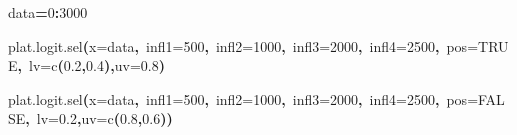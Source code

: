 \documentclass[letterpaper, 12pt]{article}
\newenvironment{Hinput}%
{}%
{}%
\newenvironment{Hchunk}%
{\vspace{0.5em}\par\begin{flushleft}}%
{\end{flushleft}}%
\newcommand{\hlnumber}[1]{\textcolor[rgb]{0.0823529411764706,0.0784313725490196,0.709803921568627}{#1}}%
\newcommand{\hlfunctioncall}[1]{\textcolor[rgb]{1,0,0}{#1}}%
\newcommand{\hlkeyword}[1]{\textcolor[rgb]{0,0,0}{\textbf{#1}}}%
\newcommand{\hlargument}[1]{\textcolor[rgb]{0.694117647058824,0.247058823529412,0.0196078431372549}{#1}}%
\newcommand{\hlassignement}[1]{\textcolor[rgb]{0.215686274509804,0.215686274509804,0.384313725490196}{\textbf{#1}}}%
\newcommand{\hlsymbol}[1]{\textcolor[rgb]{0,0,0}{#1}}%
\newcommand{\hlprompt}[1]{\textcolor[rgb]{0,0,0}{#1}}%
\begin{document}
\begin{Hchunk}
\begin{normalsize}
\begin{Hinput}
\ttfamily\noindent
\hlprompt{\usebox{\hlnormalsizeboxgreaterthan}{\ }}\hlsymbol{data}\hlassignement{=}\hlnumber{0}\hlkeyword{:}\hlnumber{3000}\mbox{}
\normalfont
\end{Hinput}


\begin{Hinput}
\ttfamily\noindent
\hlprompt{\usebox{\hlnormalsizeboxgreaterthan}{\ }}\hlfunctioncall{plat.logit.sel}\hlkeyword{(}\hlargument{x}\hlargument{=}\hlsymbol{data}\hlkeyword{,}{\ }\hlargument{infl1}\hlargument{=}\hlnumber{500}\hlkeyword{,}{\ }\hlargument{infl2}\hlargument{=}\hlnumber{1000}\hlkeyword{,}{\ }\hlargument{infl3}\hlargument{=}\hlnumber{2000}\hlkeyword{,}{\ }\hlargument{infl4}\hlargument{=}\hlnumber{2500}\hlkeyword{,}{\ }\hlargument{pos}\hlargument{=}\hlnumber{TRUE}\hlkeyword{,}{\ }\hlargument{lv}\hlargument{=}\hlfunctioncall{c}\hlkeyword{(}\hlnumber{0.2}\hlkeyword{,}\hlnumber{0.4}\hlkeyword{)}\hlkeyword{,}\hlargument{uv}\hlargument{=}\hlnumber{0.8}\hlkeyword{)}\mbox{}
\normalfont
\end{Hinput}


\begin{Hinput}
\ttfamily\noindent
\hlprompt{\usebox{\hlnormalsizeboxgreaterthan}{\ }}\hlfunctioncall{plat.logit.sel}\hlkeyword{(}\hlargument{x}\hlargument{=}\hlsymbol{data}\hlkeyword{,}{\ }\hlargument{infl1}\hlargument{=}\hlnumber{500}\hlkeyword{,}{\ }\hlargument{infl2}\hlargument{=}\hlnumber{1000}\hlkeyword{,}{\ }\hlargument{infl3}\hlargument{=}\hlnumber{2000}\hlkeyword{,}{\ }\hlargument{infl4}\hlargument{=}\hlnumber{2500}\hlkeyword{,}{\ }\hlargument{pos}\hlargument{=}\hlnumber{FALSE}\hlkeyword{,}{\ }\hlargument{lv}\hlargument{=}\hlnumber{0.2}\hlkeyword{,}\hlargument{uv}\hlargument{=}\hlfunctioncall{c}\hlkeyword{(}\hlnumber{0.8}\hlkeyword{,}\hlnumber{0.6}\hlkeyword{)}\hlkeyword{)}\mbox{}
\normalfont
\end{Hinput}


\end{normalsize}
\end{Hchunk}
\end{document}
